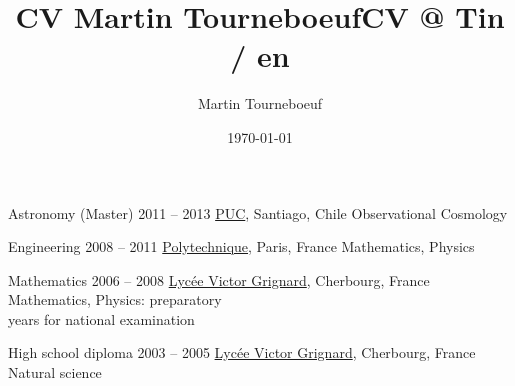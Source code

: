 \def\tbflanguage{english}

\ifx\HCode\undefined
  \providecommand\tbfbordertop{1.2}
  \providecommand\tbfborderleft{0.7}
  \providecommand\tbfwidth{12.4}
\else
  \providecommand\tbfbordertop{1}
  \providecommand\tbfborderleft{0.7}
  \providecommand\tbfwidth{12.4}
\fi

\ifx\HCode\undefined

%
\else

%
\fi

\ifx\HCode\undefined
  \title{CV Martin Tourneboeuf}
\else
  \title{CV @ Tin / en}
\fi
\author{Martin Tourneboeuf}
\date{\today}









\begin{coordinatelist}
\end{coordinatelist}



\pgfmathsetmacro{\tbfyeary}{\tbfbordertop+3.1}

\begin{yearlist}[7.7][\tbfborderleft][\tbfyeary]


\item[Astronomy (Master)]{2011 -- 2013}
  {
  \href{http://www.uc.cl/}{PUC}, Santiago, Chile
  }
  {   Observational Cosmology}


\item[Engineering]{2008 -- 2011}
  {
  \tbfix
  \href{https://www.polytechnique.edu/}{Polytechnique}, Paris, France
  }
  {    Mathematics, Physics}


\item[Mathematics]{2006 -- 2008}
  {
  \href{http://www.lycee-grignard.fr/}{Lyc\'ee Victor Grignard}, Cherbourg, France
  }
  {    Mathematics, Physics: preparatory \\ years for national examination}


\item[High school diploma]{2003 -- 2005}
  {
  \href{http://www.lycee-grignard.fr/}{Lyc\'ee Victor Grignard}, Cherbourg, France
  }
  {    Natural science}

\end{yearlist}



